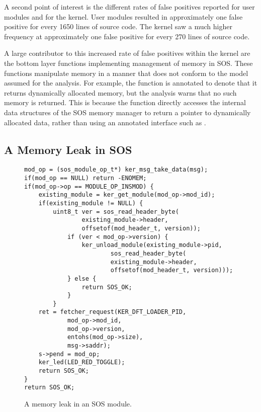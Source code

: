 A second point of interest is the different rates of false positives
reported for user modules and for the kernel.  User modules resulted
in approximately one false positive for every 1650 lines of source
code.  The kernel saw a much higher frequency at approximately one 
false positive for every 270 lines of source code.  

A large contributor to this increased rate of false positives within
the kernel are the bottom layer functions implementing management of
memory in SOS.  These functions manipulate memory in a manner that
does not conform to the model assumed for the analysis.  For example,
the function  is annotated to denote that
it returns dynamically allocated memory, but the analysis warns that
no such memory is returned.  This is because the function directly
accesses the internal data structures of the SOS memory manager to
return a pointer to dynamically allocated data, rather than using an
annotated interface such as .
%


%
% 

\subsection{A Memory Leak in SOS}
\label{ss:tale}

\begin{figure}[tp]
\begin{footnotesize}
\begin{verbatim}
mod_op = (sos_module_op_t*) ker_msg_take_data(msg);
if(mod_op == NULL) return -ENOMEM;
if(mod_op->op == MODULE_OP_INSMOD) {
    existing_module = ker_get_module(mod_op->mod_id);
    if(existing_module != NULL) {
        uint8_t ver = sos_read_header_byte(
                existing_module->header,
                offsetof(mod_header_t, version));
            if (ver < mod_op->version) {
                ker_unload_module(existing_module->pid, 
                        sos_read_header_byte(
                        existing_module->header,
                        offsetof(mod_header_t, version)));
            } else {
                return SOS_OK;
            }
        }
    ret = fetcher_request(KER_DFT_LOADER_PID,
            mod_op->mod_id,
            mod_op->version,
            entohs(mod_op->size),
            msg->saddr);
    s->pend = mod_op;
    ker_led(LED_RED_TOGGLE);
    return SOS_OK;
}
return SOS_OK;
\end{verbatim}
\end{footnotesize}
\label{fig:leak}
\caption{A memory leak in an SOS module.}
\end{figure}

